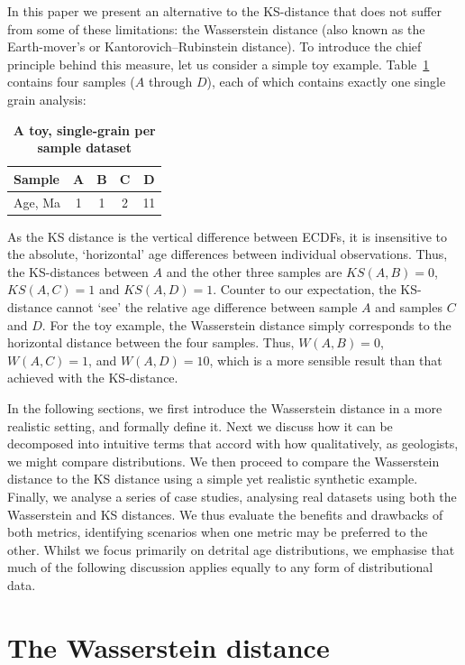 \documentclass[gchron, manuscript]{article}
\begin{document}
In this paper we present an alternative to the KS-distance that does not suffer from some of these limitations: the Wasserstein distance (also known as the Earth-mover's  or Kantorovich–Rubinstein distance). To introduce the chief principle behind this measure, let us consider a simple toy example. Table~\ref{tab:toy_samples} contains four samples ($A$ through $D$), each of which contains exactly one single grain analysis:
\begin{table}[!ht]
\centering
\caption{\textbf{A toy, single-grain per sample dataset}}
\begin{tabular}{l|cccc}
Sample & A & B & C & D  \\ \hline
Age, Ma & 1 & 1 & 2 & 11 \\
\end{tabular}
\label{tab:toy_samples}
\end{table}

As the KS distance is the vertical difference between ECDFs, it is insensitive to the absolute, `horizontal' age differences between individual observations. Thus, the KS-distances between $A$ and the other three samples are $KS(A,B) = 0$, $KS(A,C) = 1$ and $KS(A,D) = 1$. Counter to our expectation, the KS-distance cannot `see' the relative age difference between sample $A$ and samples $C$ and $D$. For the toy example, the Wasserstein distance simply corresponds to the horizontal distance between the four samples. Thus, $W(A,B) = 0$, $W(A,C) = 1$, and $W(A,D) = 10$, which is a more sensible result than that achieved with the KS-distance.

In the following sections, we first introduce the Wasserstein distance in a more realistic setting, and formally define it. Next we discuss how it can be decomposed into intuitive terms that accord with how qualitatively, as geologists, we might compare distributions. We then proceed to compare the Wasserstein distance to the KS distance using a simple yet realistic synthetic example. Finally, we analyse a series of case studies, analysing real datasets using both the Wasserstein and KS distances. We thus evaluate the benefits and drawbacks of both metrics, identifying scenarios when one metric may be preferred to the other. Whilst we focus primarily on detrital age distributions, we emphasise that much of the following discussion applies equally to any form of distributional data. 


\section{The Wasserstein distance}
\end{document}
